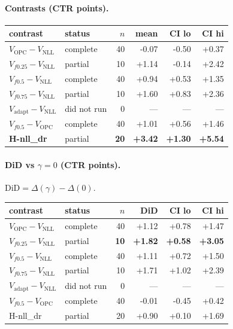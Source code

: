 \documentclass[10pt,a4paper]{article}
\begin{document}
\paragraph{Contrasts (CTR points).}
{\centering\small\begin{tabular}{llrrrr}
\toprule contrast & status & $n$ & mean & CI lo & CI hi \\
\midrule
$V_{\mathrm{OPC}}-V_{\mathrm{NLL}}$ & complete & 40 & -0.07 & -0.50 & +0.37 \\
$V_{f0.25}-V_{\mathrm{NLL}}$ & partial & 10 & +1.14 & -0.14 & +2.42 \\
$V_{f0.5}-V_{\mathrm{NLL}}$ & complete & 40 & +0.94 & +0.53 & +1.35 \\
$V_{f0.75}-V_{\mathrm{NLL}}$ & partial & 10 & +1.60 & +0.83 & +2.36 \\
$V_{\mathrm{adapt}}-V_{\mathrm{NLL}}$ & did not run & 0 & --- & --- & --- \\
$V_{f0.5}-V_{\mathrm{OPC}}$ & complete & 40 & +1.01 & +0.56 & +1.46 \\
\textbf{H-nll\_dr} & partial & \textbf{20} & \textbf{+3.42} & \textbf{+1.30} & \textbf{+5.54} \\
\bottomrule\end{tabular}\par}
\paragraph{DiD vs $\gamma=0$ (CTR points).} $\mathrm{DiD}=\Delta(\gamma)-\Delta(0)$.
{\centering\small\begin{tabular}{llrrrr}
\toprule contrast & status & $n$ & DiD & CI lo & CI hi \\
\midrule
$V_{\mathrm{OPC}}-V_{\mathrm{NLL}}$ & complete & 40 & +1.12 & +0.78 & +1.47 \\
\textbf{$V_{f0.25}-V_{\mathrm{NLL}}$} & partial & \textbf{10} & \textbf{+1.82} & \textbf{+0.58} & \textbf{+3.05} \\
$V_{f0.5}-V_{\mathrm{NLL}}$ & complete & 40 & +1.11 & +0.72 & +1.50 \\
$V_{f0.75}-V_{\mathrm{NLL}}$ & partial & 10 & +1.71 & +1.02 & +2.39 \\
$V_{\mathrm{adapt}}-V_{\mathrm{NLL}}$ & did not run & 0 & --- & --- & --- \\
$V_{f0.5}-V_{\mathrm{OPC}}$ & complete & 40 & -0.01 & -0.45 & +0.42 \\
H-nll\_dr & partial & 20 & +0.90 & +0.10 & +1.69 \\
\bottomrule\end{tabular}\par}
\bigskip
\end{document}
